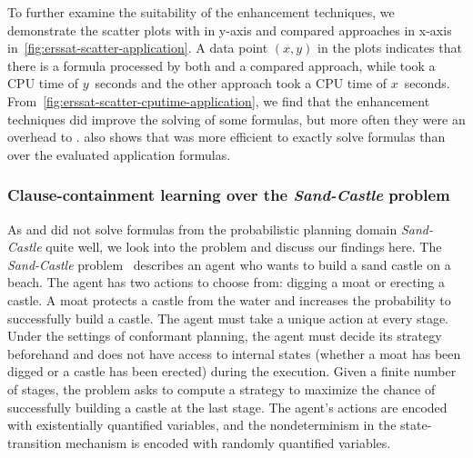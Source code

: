 To further examine the suitability of the enhancement techniques,
we demonstrate the scatter plots with \erssat in y-axis and compared approaches in x-axis
in~\cref{fig:erssat-scatter-application}.
A data point $(x,y)$ in the plots indicates that there is a formula processed by both \erssat and a compared approach,
while \erssat took a CPU time of $y$~seconds and the other approach took a CPU time of $x$~seconds.
From~\cref{fig:erssat-scatter-cputime-application},
we find that the enhancement techniques did improve the solving of some formulas,
but more often they were an overhead to \erssatb.
 also shows that
\dcssat was more efficient to exactly solve formulas than \erssat over the evaluated application formulas.

\subsubsection{Clause-containment learning over the \textit{Sand-Castle} problem}
As \erssat and \erssatb did not solve formulas from the probabilistic planning domain \textit{Sand-Castle} quite well,
we look into the problem and discuss our findings here.
The \textit{Sand-Castle} problem~\cite{Majercik1998} describes an agent who wants to build a sand castle on a beach.
The agent has two actions to choose from: digging a moat or erecting a castle.
A moat protects a castle from the water and increases the probability to successfully build a castle.
The agent must take a unique action at every stage.
Under the settings of conformant planning,
the agent must decide its strategy beforehand and does not have access to internal states
(whether a moat has been digged or a castle has been erected) during the execution.
Given a finite number of stages,
the problem asks to compute a strategy to maximize the chance of successfully building a castle at the last stage.
The agent's actions are encoded with existentially quantified variables,
and the nondeterminism in the state-transition mechanism is encoded with randomly quantified variables.

